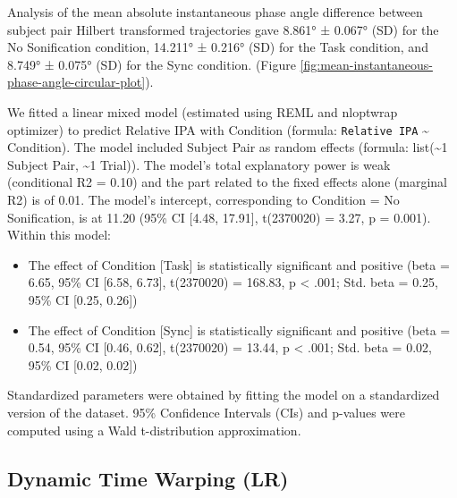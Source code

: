 \documentclass[10pt,a4paper,onecolumn]{article}
\providecommand{\tightlist}{%
  \setlength{\itemsep}{0pt}\setlength{\parskip}{0pt}}
\begin{document}
Analysis of the mean absolute instantaneous phase angle difference between subject pair Hilbert transformed trajectories gave
8.861° ± 0.067° (SD) for the No Sonification condition,
14.211° ± 0.216° (SD) for the Task condition, and
8.749° ± 0.075° (SD) for the Sync condition. (Figure \ref{fig:mean-instantaneous-phase-angle-circular-plot}).

We fitted a linear mixed model (estimated using REML and nloptwrap optimizer) to predict Relative IPA with Condition (formula: \texttt{Relative\ IPA} \textasciitilde{} Condition). The model included Subject Pair as random effects (formula: list(\textasciitilde1 \textbar{} Subject Pair, \textasciitilde1 \textbar{} Trial)). The model's total explanatory power is weak (conditional R2 = 0.10) and the part related to the fixed effects alone (marginal R2) is of 0.01. The model's intercept, corresponding to Condition = No Sonification, is at 11.20 (95\% CI {[}4.48, 17.91{]}, t(2370020) = 3.27, p = 0.001). Within this model:

\begin{itemize}
\tightlist
\item
  The effect of Condition {[}Task{]} is statistically significant and positive (beta = 6.65, 95\% CI {[}6.58, 6.73{]}, t(2370020) = 168.83, p \textless{} .001; Std. beta = 0.25, 95\% CI {[}0.25, 0.26{]})
\item
  The effect of Condition {[}Sync{]} is statistically significant and positive (beta = 0.54, 95\% CI {[}0.46, 0.62{]}, t(2370020) = 13.44, p \textless{} .001; Std. beta = 0.02, 95\% CI {[}0.02, 0.02{]})
\end{itemize}

Standardized parameters were obtained by fitting the model on a standardized version of the dataset. 95\% Confidence Intervals (CIs) and p-values were computed using a Wald t-distribution approximation.

\hypertarget{dynamic-time-warping-lr-1}{%
\subsection{Dynamic Time Warping (LR)}\label{dynamic-time-warping-lr-1}}
\end{document}
